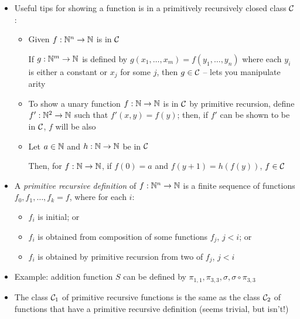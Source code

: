 \begin{itemize}
	\newpage
	
	\item Useful tips for showing a function is in a primitively recursively closed class $ \mathcal{C} $:
	
	
	\begin{itemize}
		
		\item Given $ f: \mathbb{N}^n \to \mathbb{N} $ is in $ \mathcal{C} $
		
		If $ g: \mathbb{N}^m \to \mathbb{N} $ is defined by $ g(x_1, \dots, x_m) = f(y_1, \dots, y_n) $ where each $ y_i $ is either a constant or $ x_j $ for some $ j $, then $ g \in \mathcal{C} $ -- lets you manipulate arity
		
		\item To show a unary function $ f: \mathbb{N} \to \mathbb{N} $ is in $ \mathcal{C} $ by primitive recursion, define $ f': \mathbb{N}^2 \to \mathbb{N} $ such that $ f'(x, y) = f(y) $; then, if $ f' $ can be shown to be in $ \mathcal{C} $, $ f $ will be also
		
		\item Let $ a \in \mathbb{N} $ and $ h: \mathbb{N} \to \mathbb{N} $ be in $ \mathcal{C} $
		
		Then, for $ f: \mathbb{N} \to \mathbb{N} $, if $ f(0) = a $ and $ f(y + 1) = h(f(y)) $, $ f \in \mathcal{C} $
		
	\end{itemize}

	\item A \textit{primitive recursive definition} of $ f: \mathbb{N}^n \to \mathbb{N} $ is a finite sequence of functions $ f_0, f_1, \dots, f_k = f $, where for each $ i $:
	
	\begin{itemize}
		
		\item $ f_i $ is initial; or
		
		\item $ f_i $ is obtained from composition of some functions $ f_j $, $ j < i $; or
		
		\item $ f_i $ is obtained by primitive recursion from two of $ f_j $, $ j < i $
		
	\end{itemize}

	\item Example: addition function $ S $ can be defined by $ \pi_{1, 1}, \pi_{3, 3}, \sigma, \sigma \circ \pi_{3, 3} $
	
	\item The class $ \mathcal{C}_1 $ of primitive recursive functions is the same as the class $ \mathcal{C}_2 $ of functions that have a primitive recursive definition (seems trivial, but isn't!)
	

\end{itemize}

